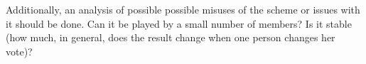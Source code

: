 \documentclass[a4paper]{acm_proc_article-sp}
\begin{document}
Additionally, an analysis of possible possible misuses of the scheme or issues with it should be done. Can it be played by a small number of members? Is it stable (how much, in general, does the result change when one person changes her vote)?






%
\end{document}
